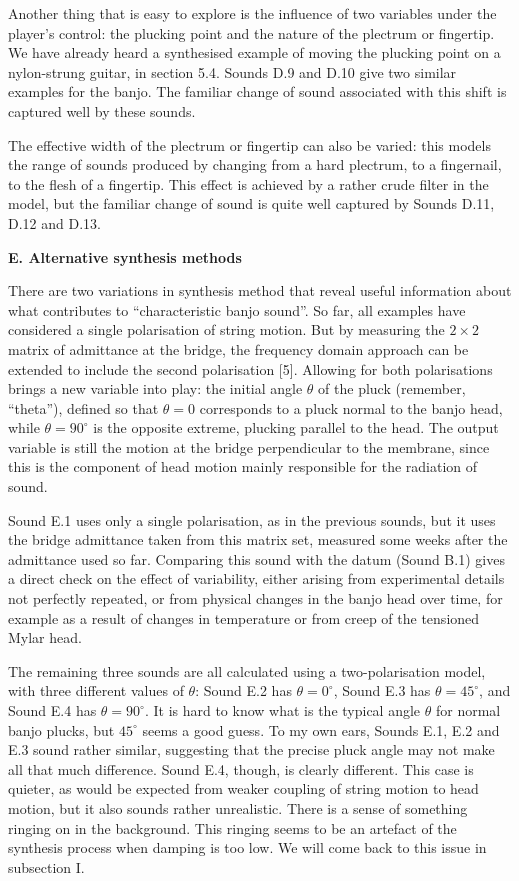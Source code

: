  Another thing that is easy to explore is the influence of two variables under 
  the player's control: the plucking point and the nature of the plectrum or 
  fingertip. We have already heard a synthesised example of moving the plucking 
  point on a nylon-strung guitar, in section 5.4. Sounds D.9 and D.10 give two 
  similar examples for the banjo. The familiar change of sound associated with 
  this shift is captured well by these sounds. 

  The effective width of the plectrum or fingertip can also be varied: this 
  models the range of sounds produced by changing from a hard plectrum, to a 
  fingernail, to the flesh of a fingertip. This effect is achieved by a rather 
  crude filter in the model, but the familiar change of sound is quite well 
  captured by Sounds D.11, D.12 and D.13. 

  \textbf{E. Alternative synthesis methods} 

  There are two variations in synthesis method that reveal useful information 
  about what contributes to ``characteristic banjo sound''. So far, all 
  examples have considered a single polarisation of string motion. But by 
  measuring the $2 \times 2$ matrix of admittance at the bridge, the frequency 
  domain approach can be extended to include the second polarisation [5]. 
  Allowing for both polarisations brings a new variable into play: the initial 
  angle $\theta$ of the pluck (remember, ``theta''), defined so that $\theta = 
  0$ corresponds to a pluck normal to the banjo head, while $\theta = 90^\circ$ 
  is the opposite extreme, plucking parallel to the head. The output variable 
  is still the motion at the bridge perpendicular to the membrane, since this 
  is the component of head motion mainly responsible for the radiation of 
  sound. 

  Sound E.1 uses only a single polarisation, as in the previous sounds, but it 
  uses the bridge admittance taken from this matrix set, measured some weeks 
  after the admittance used so far. Comparing this sound with the datum (Sound 
  B.1) gives a direct check on the effect of variability, either arising from 
  experimental details not perfectly repeated, or from physical changes in the 
  banjo head over time, for example as a result of changes in temperature or 
  from creep of the tensioned Mylar head. 

  The remaining three sounds are all calculated using a two-polarisation model, 
  with three different values of $\theta$: Sound E.2 has $\theta = 0^\circ$, 
  Sound E.3 has $\theta = 45^\circ$, and Sound E.4 has $\theta = 90^\circ$. It 
  is hard to know what is the typical angle $\theta$ for normal banjo plucks, 
  but $45^\circ$ seems a good guess. To my own ears, Sounds E.1, E.2 and E.3 
  sound rather similar, suggesting that the precise pluck angle may not make 
  all that much difference. Sound E.4, though, is clearly different. This case 
  is quieter, as would be expected from weaker coupling of string motion to 
  head motion, but it also sounds rather unrealistic. There is a sense of 
  something ringing on in the background. This ringing seems to be an artefact 
  of the synthesis process when damping is too low. We will come back to this 
  issue in subsection I. 

